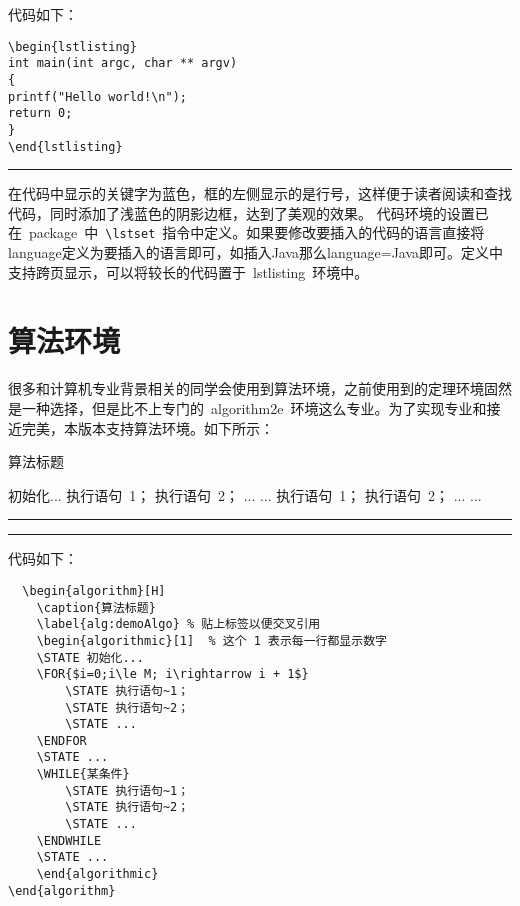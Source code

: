 \noindent 代码如下：
\begin{verbatim}
\begin{lstlisting}
int main(int argc, char ** argv)
{
printf("Hello world!\n");
return 0;
}
\end{lstlisting}
\end{verbatim}
\noindent\hrule\vspace{1em}

在代码中显示的关键字为蓝色，框的左侧显示的是行号，这样便于读者阅读和查找代码，同时添加了浅蓝色的阴影边框，达到了美观的效果。
代码环境的设置已在~package~中~\verb|\lstset|~指令中定义。如果要修改要插入的代码的语言直接将language定义为要插入的语言即可，如插入Java那么language=Java即可。定义中支持跨页显示，可以将较长的代码置于~lstlisting~环境中。
\section{算法环境}
很多和计算机专业背景相关的同学会使用到算法环境，之前使用到的定理环境固然是一种选择，但是比不上专门的~algorithm2e~环境这么专业。为了实现专业和接近完美，本版本支持算法环境。如下所示：
\begin{algorithm}[H]
    \caption{算法标题}
    \label{alg:demoAlgo} %
    \begin{algorithmic}[1]  %
    \STATE 初始化...
        \STATE 执行语句~1；
        \STATE 执行语句~2；
        \STATE ...
    \ENDFOR
    \STATE ...
        \STATE 执行语句~1；
        \STATE 执行语句~2；
        \STATE ...
    \ENDWHILE
    \STATE ...
    \end{algorithmic}
\end{algorithm}
\noindent\hrule
\vspace{0.1em}\noindent\hrule

\vspace{1em}

\noindent 代码如下：
\begin{verbatim}
  \begin{algorithm}[H]
    \caption{算法标题}
    \label{alg:demoAlgo} % 贴上标签以便交叉引用
    \begin{algorithmic}[1]  % 这个 1 表示每一行都显示数字
    \STATE 初始化...
    \FOR{$i=0;i\le M; i\rightarrow i + 1$}
        \STATE 执行语句~1；
        \STATE 执行语句~2；
        \STATE ...
    \ENDFOR
    \STATE ...
    \WHILE{某条件}
        \STATE 执行语句~1；
        \STATE 执行语句~2；
        \STATE ...
    \ENDWHILE
    \STATE ...
    \end{algorithmic}
\end{algorithm}
\end{verbatim}

